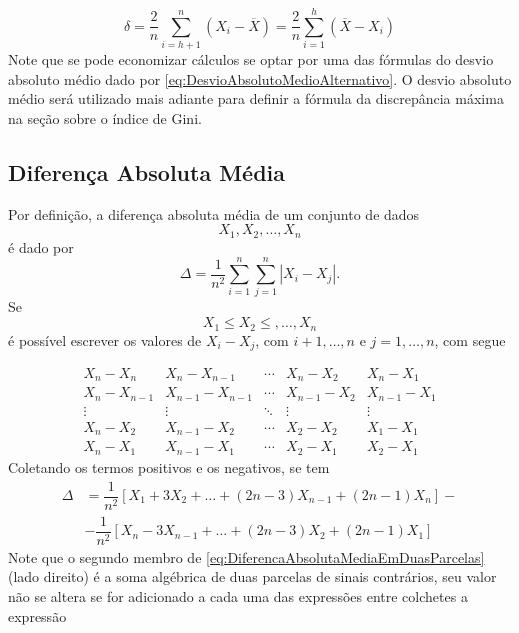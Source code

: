\documentclass[
]{book}
\begin{document}
\[
  \delta = \dfrac{2}{n} \sum_ {i=h+1}^{n}\left( X_i - \overline{X} \right) = \dfrac{2}{n} \sum_ {i=1}^{h} \left( \overline{X} - X_i  \right)
\label{eq:DesvioAbsolutoMedioAlternativo}
\]
Note que se pode economizar cálculos se optar por uma das fórmulas do desvio absoluto médio dado por \eqref{eq:DesvioAbsolutoMedioAlternativo}. O desvio absoluto médio será utilizado mais adiante para definir a fórmula da discrepância máxima na seção sobre o índice de Gini.

\hypertarget{diferenuxe7a-absoluta-muxe9dia}{%
\subsection{Diferença Absoluta Média}\label{diferenuxe7a-absoluta-muxe9dia}}

Por definição, a diferença absoluta média de um conjunto de dados
\[
X_1, X_2, \ldots, X_n
\]
é dado por
\[
\Delta = \dfrac{1}{n^2} \sum_{i=1}^{n} \sum_{j=1}^{n} \left| X_i - X_j \right|.
\]
Se
\[
X_1 \leq X_2 \leq , \ldots, X_n
\]
é possível escrever os valores de \(X_i -X_j\), com \(i+1,\ldots, n\) e \(j=1,\ldots,n\), com segue

\[
  \begin{array}{ccccc}
    X_n - X_n         & X_n - X_{n-1}         & \cdots    & X_n - X_2       & X_n - X_1 \\
    X_n - X_{n-1}     & X_{n-1} - X_{n-1}     & \cdots    & X_{n-1} - X_2   & X_{n-1} - X_1 \\
    \vdots            & \vdots                & \ddots    & \vdots          & \vdots \\
    X_n - X_2         & X_{n-1} - X_2         & \cdots    & X_2 - X_2       & X_1 - X_1 \\
    X_n - X_1         & X_{n-1} - X_1         & \cdots    & X_2 - X_1       & X_2 - X_1 
  \end{array}
\]
Coletando os termos positivos e os negativos, se tem
\[
  \begin{split}
    \Delta    & = \dfrac{1}{n^2} \left[ X_1 + 3X_2 + \ldots + (2n - 3)X_{n-1} + (2n-1)X_n \right] -  \\
              & - \dfrac{1}{n^2}\left[ X_n - 3X_{n-1} + \ldots + (2n - 3)X_2 + (2n -1)X_1 \right]
  \end{split}
\label{eq:DiferencaAbsolutaMediaEmDuasParcelas}
\]
Note que o segundo membro de \eqref{eq:DiferencaAbsolutaMediaEmDuasParcelas} (lado direito) é a soma algébrica de duas parcelas de sinais contrários, seu valor não se altera se for adicionado a cada uma das expressões entre colchetes a expressão
\end{document}
